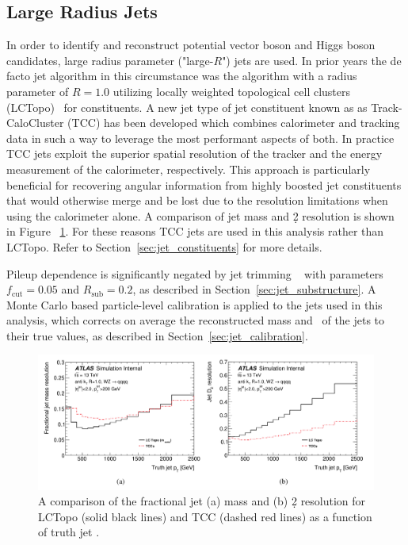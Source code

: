 \subsection{Large Radius Jets}
\label{sec:tccjets}
In order to identify and reconstruct potential vector boson and Higgs boson candidates, large radius parameter ("large-$R$") jets are used.
In prior years the de facto jet algorithm in this circumstance was the \akt algorithm with a radius parameter of $R=1.0$ utilizing locally weighted topological cell clusters (LCTopo)~\cite{PERF-2014-07} for constituents.
A new jet type of jet constituent known as as Track-CaloCluster (TCC) has been developed \cite{ATL-PHYS-PUB-2017-015} which combines calorimeter and tracking data in such a way to leverage the most performant aspects of both.
In practice TCC jets exploit the superior spatial resolution of the tracker and the energy measurement of the calorimeter, respectively.
This approach is particularly beneficial for recovering angular information from highly boosted jet constituents that would otherwise merge and be lost due to the resolution limitations when using the calorimeter alone.
A comparison of jet mass and \d2 resolution is shown in Figure ~\ref{fig:tcc_lctopo_res}.
For these reasons TCC jets are used in this analysis rather than LCTopo.
Refer to Section~\ref{sec:jet_constituents} for more details.

Pileup dependence is significantly negated by jet trimming ~\cite{Krohn:2009th} with parameters $f_{\mathrm{cut}} = 0.05$ and $R_{\mathrm{sub}} = 0.2$, as described in Section~\ref{sec:jet_substructure}.
A Monte Carlo based particle-level calibration is applied to the jets used in this analysis, which corrects on average the reconstructed mass and \pt\ of the jets to their true values, as described in Section~\ref{sec:jet_calibration}.

\begin{figure}[htbp!]
\begin{center}
\includegraphics[width=\textwidth]{TCC_LCTopo_Mass_D2_resolution.png}
\end{center}
\caption{A comparison of the fractional jet (a) mass and (b) \d2 resolution for LCTopo (solid black lines) and TCC (dashed red lines) as a function of truth jet \pt.}
\label{fig:tcc_lctopo_res}
\end{figure}

